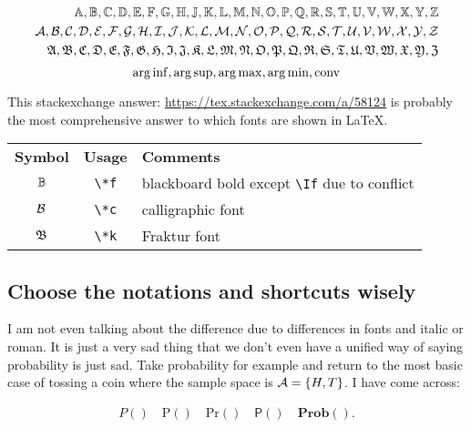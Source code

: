 \documentclass[aos,preprint]{imsart}
\begin{document}
\begin{align*}
	\Af, \Bf, \Cf, \Df, \Ef, \Ff, \Gf, \Hf, \Jf, \Kf, \Lf, \Mf, \Nf, \Of, \Pf,
	\Qf, \Rf, \Sf, \Tf, \Uf, \Vf, \Wf, \Xf, \Yf, \Zf      \\
	\Ac, \Bc, \Cc, \Dc, \Ec, \Fc, \Gc, \Hc, \Ic, \Jc, \Kc, \Lc, \Mc, \Nc, \Oc,
	\Pc, \Qc, \Rc, \Sc, \Tc, \Uc, \Vc, \Wc, \Xc, \Yc, \Zc \\
	\Ak, \Bk, \Ck, \Dk, \Ek, \Fk, \Gk, \Hk, \Ik, \Jk, \Kk, \Lk, \Mk, \Nk, \Ok,
	\Pk, \Qk, \Rk, \Sk, \Tk, \Uk, \Vk, \Wk, \Xk, \Yk, \Zk
\end{align*}
$$
	\operatorname*{arg\, inf}, \operatorname*{arg\, sup}, \operatorname*{arg\, max}, \operatorname*{arg\, min}, \mathrm{conv}
$$

This stackexchange answer: \url{https://tex.stackexchange.com/a/58124}
is probably the most comprehensive answer to which fonts are shown in \LaTeX.

\begin{tabular}{ccl}
	\textbf{Symbol} & \textbf{Usage} & \textbf{Comments}                                 \\
	$\mathbb{B}$           & \verb|\*f|     & blackboard bold except \verb|\If| due to conflict \\
	$\mathcal{B}$           & \verb|\*c|     & calligraphic font                                 \\
	$\mathfrak{B}$           & \verb|\*k|     & Fraktur font                                      \\
\end{tabular}


\subsection{Choose the notations and shortcuts wisely}

I am not even talking about the difference due to differences in fonts and italic or roman.
It is just a very sad thing that we don't even have a unified way of saying probability is just sad.
Take probability for example and return to the most basic case of tossing a
coin
where the sample space is $\mathcal{A} = \{H, T\}$. I have come across:

\begin{align*}
	P() \quad \mathrm{P}() \quad \mathrm{Pr}() \quad \mathsf{P}() \quad
	\mathbf{Prob}().
\end{align*}
\end{document}
